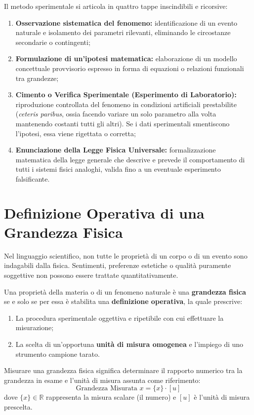 \documentclass[11pt,a4paper,oneside]{report}
\begin{document}
Il metodo sperimentale si articola in quattro tappe inscindibili e ricorsive:
\begin{enumerate}[label=\textbf{\arabic*.}]
  \item \textbf{Osservazione sistematica del fenomeno:} identificazione di un evento naturale e isolamento dei parametri rilevanti, eliminando le circostanze secondarie o contingenti;
  \item \textbf{Formulazione di un'ipotesi matematica:} elaborazione di un modello concettuale provvisorio espresso in forma di equazioni o relazioni funzionali tra grandezze;
  \item \textbf{Cimento o Verifica Sperimentale (Esperimento di Laboratorio):} riproduzione controllata del fenomeno in condizioni artificiali prestabilite (\textit{ceteris paribus}, ossia facendo variare un solo parametro alla volta mantenendo costanti tutti gli altri). Se i dati sperimentali smentiscono l'ipotesi, essa viene rigettata o corretta;
  \item \textbf{Enunciazione della Legge Fisica Universale:} formalizzazione matematica della legge generale che descrive e prevede il comportamento di tutti i sistemi fisici analoghi, valida fino a un eventuale esperimento falsificante.
\end{enumerate}

\section{Definizione Operativa di una Grandezza Fisica}
Nel linguaggio scientifico, non tutte le proprietà di un corpo o di un evento sono indagabili dalla fisica. 
Sentimenti, preferenze estetiche o qualità puramente soggettive non possono essere trattate quantitativamente.

\begin{definizione}
Una proprietà della materia o di un fenomeno naturale è una \textbf{grandezza fisica} se e solo se per essa è stabilita una \textbf{definizione operativa}, la quale prescrive:
\begin{enumerate}[label=\alph*)]
  \item La procedura sperimentale oggettiva e ripetibile con cui effettuare la misurazione;
  \item La scelta di un'opportuna \textbf{unità di misura omogenea} e l'impiego di uno strumento campione tarato.
\end{enumerate}
Misurare una grandezza fisica significa determinare il rapporto numerico tra la grandezza in esame e l'unità di misura assunta come riferimento:
\[
\text{Grandezza Misurata } x = \{x\} \cdot [u]
\]
dove $\{x\} \in \mathbb{R}$ rappresenta la misura scalare (il numero) e $[u]$ è l'unità di misura prescelta.
\end{definizione}
\end{document}
